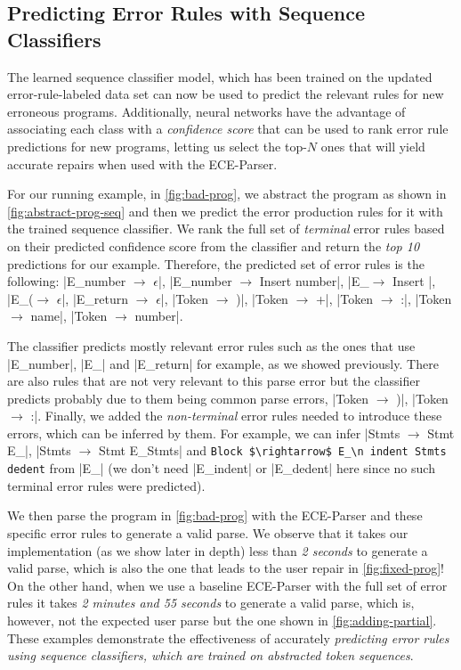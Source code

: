 \subsection{Predicting Error Rules with Sequence Classifiers}
\label{sec:overview:seq-classifiers}

The learned sequence classifier model, which has been trained on the updated
error-rule-labeled data set can now be used to predict the relevant rules for
new erroneous programs.
%
Additionally, neural networks have
the advantage of associating each
class with a \emph{confidence score}
that can be used to rank error rule
predictions for new programs, letting
us select the top-$N$ ones that will
yield accurate repairs when used
with the ECE-Parser.

For our running example, in \autoref{fig:bad-prog}, we abstract the program as
shown in \autoref{fig:abstract-prog-seq} and then we predict the error
production rules for it with the trained sequence classifier. We rank the full
set of \emph{terminal} error rules based on their predicted confidence score
from the classifier and return the \emph{top 10} predictions for our example.
Therefore, the predicted set of error rules is the following:
%
|E_number $\rightarrow$ $\epsilon$|,
%
|E_number $\rightarrow$ Insert number|, |E_\n $\rightarrow$ Insert \n|,
%
|E_($\rightarrow$ $\epsilon$|,
%
|E_return $\rightarrow$ $\epsilon$|, |Token $\rightarrow$ )|,
%
|Token $\rightarrow$ +|, |Token $\rightarrow$ :|, |Token $\rightarrow$ name|,
%
|Token $\rightarrow$ number|.

The classifier predicts mostly relevant error rules such as the ones that use
|E_number|, |E_\n| and |E_return| for example, as we showed previously. There
are also rules that are not very relevant to this parse error but the classifier
predicts probably due to them being common parse errors, \eg
%
|Token $\rightarrow$ )|, |Token $\rightarrow$ :|. Finally, we added the
\emph{non-terminal} error rules needed to introduce these errors, which can be
inferred by them. For example, we can infer
%
|Stmts $\rightarrow$ Stmt E_\n|, |Stmts $\rightarrow$ Stmt E_\n Stmts| and
%
\lstinline{Block $\rightarrow$ E_\n indent Stmts dedent} from |E_\n| (we don't
need \linebreak |E_indent| or |E_dedent| here since no such terminal error rules were
predicted).

We then parse the program in \autoref{fig:bad-prog} with the ECE-Parser and
these specific error rules to generate a valid parse. We observe that it takes
our implementation (as we show later in depth) less than \emph{2 seconds} to
generate a valid parse, which is also the one that leads to the user repair in
\autoref{fig:fixed-prog}! On the other hand, when we use a baseline ECE-Parser
with the full set of error rules it takes \emph{2 minutes and 55 seconds} to
generate a valid parse, which is, however, not the expected user parse but the
one shown in \autoref{fig:adding-partial}. These examples demonstrate the
effectiveness of accurately \emph{predicting error rules using sequence
classifiers, which are trained on abstracted token sequences}.

